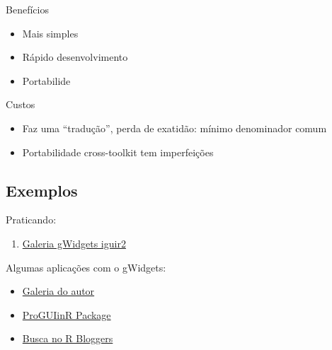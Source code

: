 \begin{frame}
  \begin{multicols}{2}
    
    \begin{block}{Benefícios}
      \begin{itemize}
      \item Mais simples
      \item Rápido desenvolvimento
      \item Portabilide
      \end{itemize}
    \end{block}
    \vfill \columnbreak
    \begin{block}{Custos}
      \begin{itemize}
      \item Faz uma ``tradução'', perda de exatidão: mínimo denominador
        comum
      \item Portabilidade cross-toolkit tem imperfeições
      \end{itemize}
    \end{block}
  \end{multicols}


\end{frame}


\subsection{Exemplos}

\begin{frame}
  Praticando:
  \begin{enumerate}
  \item \href{run:../gWidgets/gWidgets.html}{Galeria gWidgets iguir2}
  \end{enumerate}

  \vspace{0.5cm} Algumas aplicações com o gWidgets:
  \begin{itemize}
  \item
    \href{http://cran.r-project.org/web/packages/gWidgets/vignettes/}{Galeria
      do autor}
  \item \href{https://github.com/jverzani/ProgGUIinR}{ProGUIinR Package}
  \item \href{http://www.r-bloggers.com/?s=gWidgets}{Busca no R
      Bloggers}
  \end{itemize}
\end{frame}

